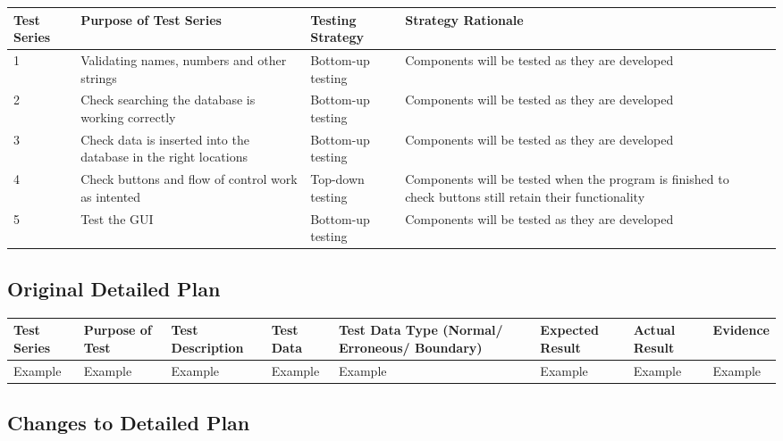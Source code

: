 \begin{landscape}
\begin{center}
	\begin{tabular}{|p{2cm}|p{2cm}|p{2cm}|p{2cm}|l}
		\hline
		\textbf{Test Series}   & \textbf{Purpose of Test Series}   & \textbf{Testing Strategy}   & \textbf{Strategy Rationale} \\ \hline
		1  & Validating names, numbers and other strings  & Bottom-up testing  & Components will be tested as they are developed \\ \hline
		2  & Check searching the database is working correctly & Bottom-up testing  & Components will be tested as they are developed \\ \hline
		3  & Check data is inserted into the database in the right locations & Bottom-up testing  & Components will be tested as they are developed \\ \hline
		4  & Check buttons and flow of control work as intented & Top-down testing  & Components will be tested when the program is finished to check buttons still retain their functionality \\ \hline
		5  & Test the GUI & Bottom-up testing  & Components will be tested as they are developed \\ \hline
\end{tabular}
\end{center}

\subsection{Original Detailed Plan}

\begin{center}
    \begin{longtable}{|p{1.5cm}|p{2.5cm}|p{2.5cm}|p{2cm}|p{2cm}|p{2cm}|p{2cm}|p{2cm}|}
        \hline
        \textbf{Test Series} & \textbf{Purpose of Test} & \textbf{Test Description} & \textbf{Test Data} & \textbf{Test Data Type (Normal/ Erroneous/ Boundary)} & \textbf{Expected Result} & \textbf{Actual Result} & \textbf{Evidence}\\ \hline
        Example & Example & Example & Example & Example & Example & Example & Example \\ \hline
    \end{longtable}
\end{center}

\subsection{Changes to Detailed Plan}


\end{landscape}
